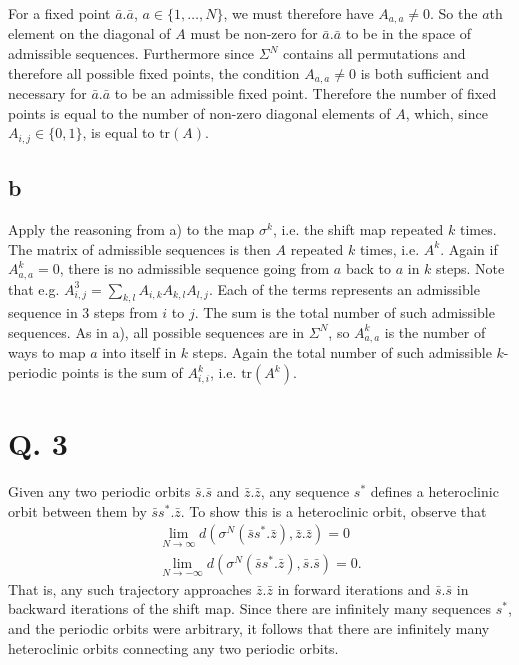 \documentclass[12pt,A4]{article}
\begin{document}
For a fixed point $\bar{a}.\bar{a}$, $a \in \{1, \ldots , N\}$, we must therefore have $A_{a,a} \ne 0$. So the $a$th element on the diagonal of $A$ must be non-zero for $\bar{a}.\bar{a}$ to be in the space of admissible sequences. Furthermore since $\Sigma^N$ contains all permutations and therefore all possible fixed points, the condition $A_{a,a} \ne 0$ is both sufficient and necessary for $\bar{a}.\bar{a}$ to be an admissible fixed point. Therefore the number of fixed points is equal to the number of non-zero diagonal elements of $A$, which, since $A_{i,j} \in \{0,1\}$, is equal to $\text{tr}(A)$. 

\subsection*{b}
Apply the reasoning from a) to the map $\sigma^k$, i.e. the shift map repeated $k$ times. The matrix of admissible sequences is then $A$ repeated $k$ times, i.e. $A^k$. Again if $A^k_{a,a} = 0$, there is no admissible sequence going from $a$ back to $a$ in $k$ steps. Note that e.g. $A^3_{i,j} = \sum_{k,l} A_{i,k} A_{k,l} A_{l,j}$. Each of the terms represents an admissible sequence in 3 steps from $i$ to $j$. The sum is the total number of such admissible sequences. As in a), all possible sequences are in $\Sigma^N$, so $A^k_{a,a}$ is the number of ways to map $a$ into itself in $k$ steps. Again the total number of such admissible $k$-periodic points is the sum of $A^k_{i,i}$, i.e. $\text{tr}(A^k)$.

\clearpage
\section*{Q. 3}
Given any two periodic orbits $\bar{s}.\bar{s}$ and $\bar{z}.\bar{z}$, any sequence $s^*$ defines a heteroclinic orbit between them by $\bar{s} s^*.\bar{z}$. To show this is a heteroclinic orbit, observe that 
\begin{equation}
\begin{aligned}
    \lim_{N \to \infty} d(\sigma^N (\bar{s} s^*.\bar{z}), \bar{z}.\bar{z}) = 0 \\
    \lim_{N \to -\infty} d(\sigma^N (\bar{s} s^*.\bar{z}), \bar{s}.\bar{s}) = 0.
\end{aligned}
\end{equation}
That is, any such trajectory approaches $\bar{z}.\bar{z}$ in forward iterations and $\bar{s}.\bar{s}$ in backward iterations of the shift map. Since there are infinitely many sequences $s^*$, and the periodic orbits were arbitrary, it follows that there are infinitely many heteroclinic orbits connecting any two periodic orbits.
\end{document}

